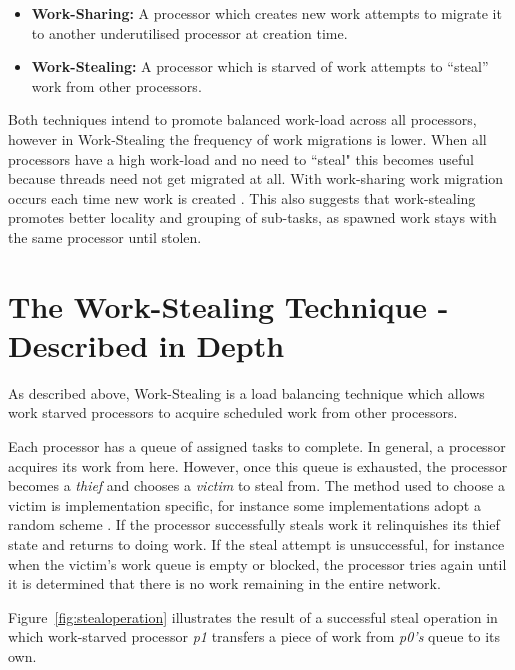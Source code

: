 \begin{itemize}
\item \textbf{Work-Sharing:} A processor which creates new work attempts to migrate it to another underutilised processor at creation time. 
\item \textbf{Work-Stealing:} A processor which is starved of work attempts to ``steal'' work from other processors. 
\end{itemize}

Both techniques intend to promote balanced work-load across all processors, however in Work-Stealing
the frequency of work migrations is lower. When all processors have a 
high work-load and no need to ``steal" this becomes useful because threads need not get 
migrated at all. With work-sharing work migration occurs each time new work is created \cite[p.~2]{blumleis}.
This also suggests that work-stealing promotes better locality and grouping of sub-tasks, as spawned work 
stays with the same processor until stolen.


\section{The Work-Stealing Technique - Described in Depth}

As described above, Work-Stealing is a load balancing technique which allows work starved processors to acquire scheduled work from other processors. 

Each processor has a queue of assigned tasks to complete. In general, a processor acquires its work from here.
However, once this queue is exhausted, the processor becomes a \textit{thief} and chooses a \textit{victim} to steal from. 
The method used to choose a victim is implementation specific, for instance some implementations adopt a random scheme \cite{blumleis , jliff, narora}.
If the processor successfully steals work it relinquishes its thief state and returns to doing work.
If the steal attempt is unsuccessful, for instance when the victim's work queue is empty or blocked, the processor tries again
until it is determined that there is no work remaining in the entire network. 

Figure~\ref{fig:stealoperation} illustrates the result of a successful steal operation in which work-starved processor \textit{p1} transfers a piece
of work from \textit{p0's} queue to its own. %

